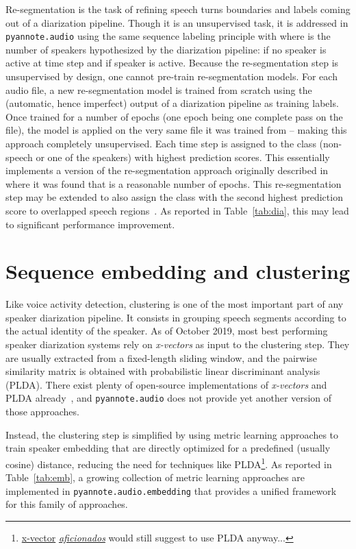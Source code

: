 \documentclass{article}
\begin{document}
Re-segmentation is the task of refining speech turns boundaries and labels coming out of a diarization pipeline.
Though it is an unsupervised task, it is addressed in {\small\texttt{pyannote.audio}} using the same sequence labeling principle with  where  is the number of speakers hypothesized by the diarization pipeline:  if no speaker is active at time step  and  if speaker  is active. Because the re-segmentation step is unsupervised by design, one cannot pre-train re-segmentation models.
For each audio file, a new re-segmentation model is trained from scratch using the (automatic, hence imperfect) output of a diarization pipeline as training labels. Once trained for a number of epochs  (one epoch being one complete pass on the file), the model is applied on the very same file it was trained from -- making this approach completely unsupervised. Each time step is assigned to the class (non-speech or one of the  speakers) with highest prediction scores. This essentially implements a version of the re-segmentation approach originally described in~\cite{Yin2018} where it was found that  is a reasonable number of epochs. This re-segmentation step may be extended to also assign the class with the second highest prediction score to overlapped speech regions~\cite{Bullock2020}. As reported in Table~\ref{tab:dia}, this may lead to significant performance improvement.

\vspace{-0.17cm}
\section{Sequence embedding and clustering}
\label{sec:clustering}

Like voice activity detection, clustering is one of the most important part of any speaker diarization pipeline.
It consists in grouping speech segments according to the actual identity of the speaker. As of October 2019, most best performing speaker diarization systems rely on \emph{x-vectors} as input to the clustering step. They are usually extracted from a fixed-length sliding window, and the pairwise similarity matrix is obtained with probabilistic linear discriminant analysis (PLDA).
There exist plenty of open-source implementations of \emph{x-vectors} and PLDA already~\cite{S4D, kaldi}, and {\small\texttt{pyannote.audio}} does not provide yet another version of those approaches.

Instead, the clustering step is simplified by using metric learning approaches to train speaker embedding that are directly optimized for a predefined (usually cosine) distance, reducing the need for techniques like PLDA\footnote{\href{https://www.clsp.jhu.edu/faculty/jesus-villalba/}{x-vector} \href{https://www.clsp.jhu.edu/faculty/paola-garcia/}{\emph{aficionados}} would still suggest to use PLDA anyway...}. As reported in Table~\ref{tab:emb}, a growing collection of metric learning approaches are implemented in {\small \texttt{pyannote.audio.embedding}} that provides a unified framework for this family of approaches.
\end{document}

